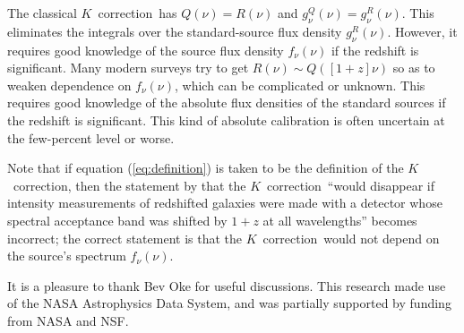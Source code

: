 \documentclass[preprint]{aastex}
\newcommand{\kcorrection}{$K$~correction}
\begin{document}
The classical \kcorrection\ has $Q(\nu)=R(\nu)$ and
$g^Q_{\nu}(\nu)=g^R_{\nu}(\nu)$.  This eliminates the integrals over
the standard-source flux density $g^R_{\nu}(\nu)$.  However, it
requires good knowledge of the source flux density $f_{\nu}(\nu)$ if
the redshift is significant.  Many modern surveys try to get
$R(\nu)\sim Q([1+z]\nu)$ so as to weaken dependence on $f_{\nu}(\nu)$,
which can be complicated or unknown.  This requires good knowledge of
the absolute flux densities of the standard sources if the redshift is
significant.  This kind of absolute calibration is often uncertain at
the few-percent level or worse.

Note that if equation (\ref{eq:definition}) is taken to be the
definition of the \kcorrection, then the statement by \citet{oke68a}
that the \kcorrection\ ``would disappear if intensity measurements of
redshifted galaxies were made with a detector whose spectral
acceptance band was shifted by $1+z$ at all wavelengths'' becomes
incorrect; the correct statement is that the \kcorrection\ would not
depend on the source's spectrum $f_{\nu}(\nu)$.

\acknowledgements It is a pleasure to thank Bev Oke for useful
discussions.  This research made use of the NASA Astrophysics Data
System, and was partially supported by funding from NASA and NSF.



\end{document}
